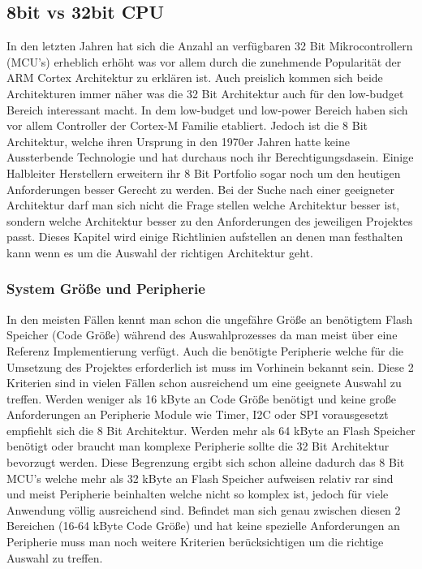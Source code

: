 \documentclass[MES,Master,ngerman]{twbook}%
\begin{document}
\subsection{8bit vs 32bit CPU}
In den letzten Jahren hat sich die Anzahl an verfügbaren 32 Bit Mikrocontrollern (MCU's) erheblich erhöht was vor allem durch die zunehmende Popularität der ARM Cortex Architektur zu erklären ist. Auch preislich kommen sich beide Architekturen immer näher was die 32 Bit Architektur auch für den low-budget Bereich interessant macht. In dem low-budget und low-power Bereich haben sich vor allem Controller der Cortex-M Familie etabliert. Jedoch ist die 8 Bit Architektur, welche ihren Ursprung in den 1970er Jahren hatte keine Aussterbende Technologie und hat durchaus noch ihr Berechtigungsdasein. Einige Halbleiter Herstellern erweitern ihr 8 Bit Portfolio sogar noch um den heutigen Anforderungen besser Gerecht zu werden. Bei der Suche nach einer geeigneter Architektur darf man sich nicht die Frage stellen welche Architektur besser ist, sondern welche Architektur besser zu den Anforderungen des jeweiligen Projektes passt. Dieses Kapitel wird einige Richtlinien aufstellen an denen man festhalten kann wenn es um die Auswahl der richtigen Architektur geht.

\subsubsection{System Größe und Peripherie}
In den meisten Fällen kennt man schon die ungefähre Größe an benötigtem Flash Speicher (Code Größe) während des Auswahlprozesses da man meist über eine Referenz Implementierung verfügt. Auch die benötigte Peripherie welche für die Umsetzung des Projektes erforderlich ist muss im Vorhinein bekannt sein. Diese 2 Kriterien sind in vielen Fällen schon ausreichend um eine geeignete Auswahl zu treffen. Werden weniger als 16 kByte an Code Größe benötigt und keine große Anforderungen an Peripherie Module wie Timer, I2C oder SPI vorausgesetzt empfiehlt sich die 8 Bit Architektur. Werden mehr als 64 kByte an Flash Speicher benötigt oder braucht man komplexe Peripherie sollte die 32 Bit Architektur bevorzugt werden. Diese Begrenzung ergibt sich schon alleine dadurch das 8 Bit MCU's welche mehr als 32 kByte an Flash Speicher aufweisen relativ rar sind und meist Peripherie beinhalten welche nicht so komplex ist, jedoch für viele Anwendung völlig ausreichend sind. Befindet man sich genau zwischen diesen 2 Bereichen (16-64 kByte Code Größe) und hat keine spezielle Anforderungen an Peripherie muss man noch weitere Kriterien berücksichtigen um die richtige Auswahl zu treffen.
\end{document}
